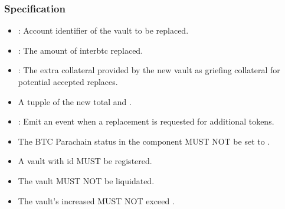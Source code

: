 \documentclass[a4paper,10pt,english]{sphinxmanual}
\begin{document}
\subsubsection{Specification}
\label{\detokenize{spec/vault-registry:id30}}


\begin{itemize}
\item {} 
: Account identifier of the vault to be replaced.

\item {} 
: The amount of interbtc replaced.

\item {} 
: The extra collateral provided by the new vault as griefing collateral for potential accepted replaces.

\end{itemize}

\begin{itemize}
\item {} 
A tupple of the new total  and .

\end{itemize}

\begin{itemize}
\item {} 
: Emit an event when a replacement is requested for additional tokens.

\end{itemize}

\begin{itemize}
\item {} 
The BTC Parachain status in the {\hyperref[\detokenize{spec/security:security}]{}} component MUST NOT be set to .

\item {} 
A vault with id  MUST be registered.

\item {} 
The vault MUST NOT be liquidated.

\item {} 
The vault’s increased  MUST NOT exceed .

\end{itemize}
\end{document}
